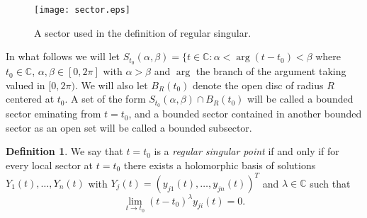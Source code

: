 \documentclass[]{book}
\numberwithin{equation}{section}
\theoremstyle{definition}
\newtheorem{definition}[theorem]{Definition}
\theoremstyle{remark}
\newcommand{\CC}{\mathbb{C}}
\newcommand{\hol}{\operatorname{Hol}}
\begin{document}
\begin{figure}[h]
	\begin{center}
	\texttt{[image: sector.eps]}
	\end{center}
	\caption{A sector used in the definition of regular singular. }
\end{figure}

In what follows we will let $S_{t_0}(\alpha,\beta) = \lbrace t \in \CC : \alpha<\arg(t-t_0) <\beta$ where $t_0 \in \CC$, $\alpha,\beta \in [0,2\pi]$ with $\alpha>\beta$ and $\arg$ the branch of the argument taking valued in $[0,2\pi)$.
We will also let $B_R(t_0)$ denote the open disc of radius $R$ centered at $t_0$.
A set of the form $S_{t_0}(\alpha,\beta) \cap B_R(t_0)$ will be called a bounded sector eminating from $t=t_0$, and a bounded sector contained in another bounded sector as an open set will be called a bounded subsector.
\iffalse 
\begin{definition}
Let $S = S_{t_0}(\alpha,\beta) \cap B_R(t_0)$ be a sector of bounded radius eminating from $t_0$ (which is by definition open and doesn't contain $t_0$).
We say that a matrix $\Phi(t) \in M_{m,n}(\hol(S))$ is \emph{regular singular at $t_0$} if and only if for all subsectors $S' \subset S$ of strictly smaller radius and angle there exists some integer $m$ such that 
 $$ \lim_{t \to t_0, t\in S'} \Vert \Phi(t) \Vert  = O( \vert t-t_0 \vert^{-m}).$$
 \end{definition}
\fi

\begin{definition}
	We say that $t=t_0$ is a \emph{regular singular point} if and only if  for every local sector at $t=t_0$ there exists a holomorphic basis of solutions $Y_1(t),\ldots,Y_n(t)$ with $Y_j(t)=(y_{j1}(t),\ldots,y_{jn}(t))^T$ and $\lambda \in \CC$ such that 
	$$ \lim_{t\to t_0} (t-t_0)^{\lambda} y_{ji}(t) =0. $$
\end{definition}
\end{document}
